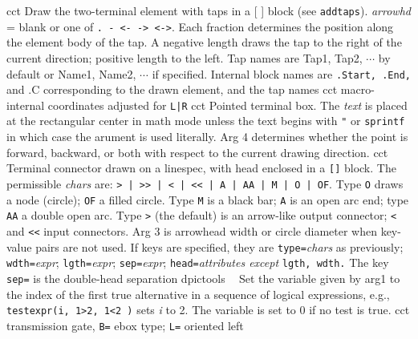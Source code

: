 %
  {cct}%
  {Draw the two-terminal element with taps in a [ ] block (see
  {\tt addtaps}).
   {\sl arrowhd} = blank or one of {\tt . - <- -> <->}.  Each fraction
   determines the position along the element body of the tap.  A negative
   length draws the tap to the right of the current direction; positive
   length to the left.  Tap names are Tap1, Tap2, $\cdots$ by default
   or Name1, Name2, $\cdots$ if specified.  Internal block names are
   {\tt .Start, .End,} and {.C} corresponding to the drawn element,
   and the tap names  }%
%
  {cct}%
  {macro-internal coordinates adjusted for {\tt L|R}}%
%
  {cct}%
  {Pointed terminal box. The {\sl text} is placed at the rectangular
  center
   in math mode unless the text begins with {\tt "} or {\tt sprintf} in
   which case the arument is used literally.  Arg 4 determines whether
   the point is forward, backward, or both with respect to the current
   drawing direction.
    }%
%
  {cct}%
  {Terminal connector drawn on a linespec, with head enclosed in a {\tt []}%
   block.  The permissible {\sl chars} are:
   {\tt > | >{}> | < | <{}< | A | AA | M | O | OF}.
   Type {\tt O} draws a node (circle); {\tt OF} a filled circle.
   Type {\tt M} is a black bar; {\tt A} is an open arc end; type {\tt AA}
   a double open arc.  Type {\tt >} (the default) is an arrow-like output
   connector; {\tt <} and {\tt <<} input connectors.  Arg 3 is arrowhead
   width or circle diameter when key-value pairs are not used.
   If keys are specified, they are {\tt type=}{\sl chars} as previously;
   {\tt wdth=}{\sl expr}; {\tt lgth=}{\sl expr}; {\tt sep=}{\sl expr};
   {\tt head=}{\sl attributes except} {\tt lgth, wdth.}
   The key {\tt sep=} is the double-head separation
    }%
%
  {dpictools}%
  {$\;\;$ Set the variable given by arg1 to the index of the first true
  alternative in a sequence of logical expressions, e.g.,
  {\tt testexpr(i, 1>2, 1<2 )} sets {\sl i} to 2. The variable is set to 0
   if no test is true.}%
%
  {cct}%
  {transmission gate, {\tt B=} ebox type; {\tt L=} oriented left
    }%
